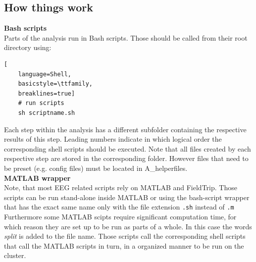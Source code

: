 \documentclass[12pt,a4paper]{scrartcl}
\begin{document}
\subsection{How things work}
\noindent\textbf{Bash scripts}\\
\noindent Parts of the analysis run in Bash scripts. Those should be called from their root directory using:
\begin{lstlisting}[
    language=Shell,
    basicstyle=\ttfamily,
    breaklines=true]
    # run scripts
    sh scriptname.sh
\end{lstlisting}
Each step within the analysis has a different subfolder containing the respective results of this step. Leading numbers indicate in which logical order the corresponding shell scripts should be executed. Note that all files created by each respective step are stored in the corresponding folder. However files that need to be preset (e.g. config files) must be located in A\_helperfiles.\\

\noindent\textbf{MATLAB wrapper}\\
\noindent Note, that most EEG related scripts rely on MATLAB and FieldTrip. Those scripts can be run stand-alone inside MATLAB or using the bash-script wrapper that has the exact same name only with the file extension \texttt{.sh} instead of \texttt{.m} Furthermore some MATLAB scipts require significant computation time, for which reason they are set up to be run as parts of a whole. In this case the words \textit{split} is added to the file name. Those scripts call the corresponding shell scripts that call the MATLAB scripts in turn, in a organized manner to be run on the cluster.\\
\end{document}
